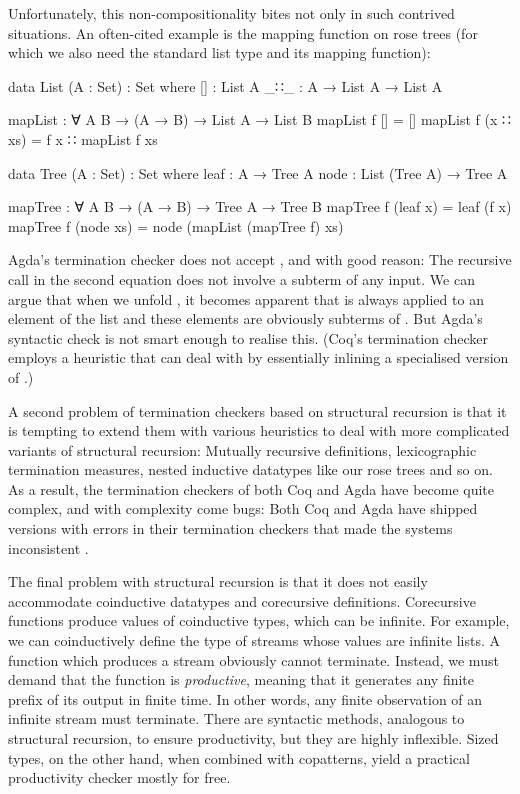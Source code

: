 Unfortunately, this non-compositionality bites not only in such contrived
situations. An often-cited example is the mapping function on rose trees (for
which we also need the standard list type and its mapping function):
\begin{code}
  data List (A : Set) : Set where
    []  : List A
    _∷_ : A → List A → List A

  mapList : ∀ {A B} → (A → B) → List A → List B
  mapList f []       = []
  mapList f (x ∷ xs) = f x ∷ mapList f xs

  data Tree (A : Set) : Set where
    leaf : A → Tree A
    node : List (Tree A) → Tree A

  mapTree : ∀ {A B} → (A → B) → Tree A → Tree B
  mapTree f (leaf x)  = leaf (f x)
  mapTree f (node xs) = node (mapList (mapTree f) xs)
\end{code}
Agda's termination checker does not accept , and with good
reason: The recursive call in the second equation does not involve a subterm of
any input. We can argue that when we unfold , it becomes apparent
that  is always applied to an element of the list  and
these elements are obviously subterms of . But Agda's syntactic check
is not smart enough to realise this. (Coq's termination checker employs a
heuristic that can deal with  by essentially inlining a
specialised version of .)

A second problem of termination checkers based on structural recursion is that
it is tempting to extend them with various heuristics to deal with more
complicated variants of structural recursion: Mutually recursive definitions,
lexicographic termination measures, nested inductive datatypes like our rose
trees and so on. As a result, the termination checkers of both Coq and Agda have
become quite complex, and with complexity come bugs: Both Coq and Agda have
shipped versions with errors in their termination checkers that made the systems
inconsistent \cite{coqbug2013,agdabug2013}.

The final problem with structural recursion is that it does not easily
accommodate coinductive datatypes and corecursive definitions. Corecursive
functions produce values of coinductive types, which can be infinite. For
example, we can coinductively define the type of streams whose values are
infinite lists. A function which produces a stream obviously cannot terminate.
Instead, we must demand that the function is \emph{productive}, meaning that it
generates any finite prefix of its output in finite time. In other words, any
finite observation of an infinite stream must terminate. There are syntactic
methods, analogous to structural recursion, to ensure productivity, but they are
highly inflexible. Sized types, on the other hand, when combined with
copatterns, yield a practical productivity checker mostly for free.

